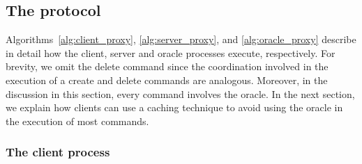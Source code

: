 \subsection{The \dynastar protocol}

Algorithms~\ref{alg:client_proxy}, \ref{alg:server_proxy}, and \ref{alg:oracle_proxy} describe in detail how the client, server and oracle processes execute, respectively. 
For brevity, we omit the delete command since the coordination involved in the execution of a create and delete commands are analogous. 
Moreover, in the discussion in this section, every command involves the oracle.
In the next section, we explain how clients can use a caching technique to avoid using the oracle in the execution of most commands.









\subsubsection{The client process} 

